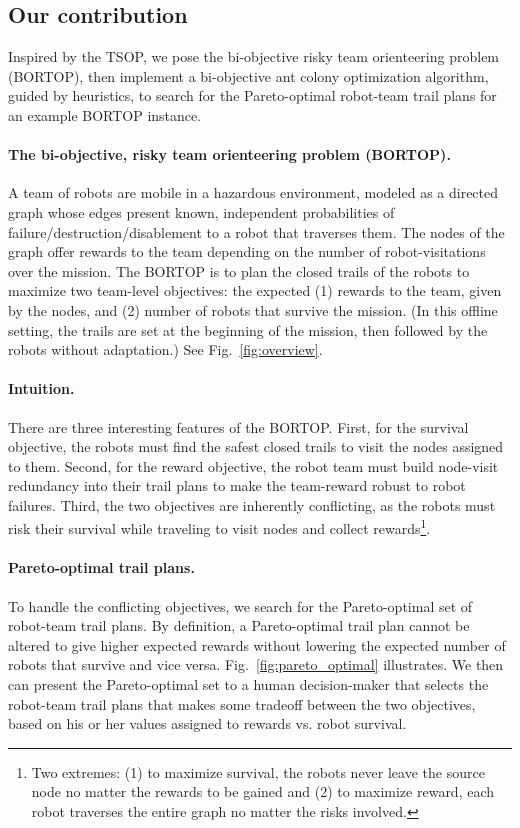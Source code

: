 \documentclass[11pt, oneside]{article}
\begin{document}
\subsection{Our contribution}
Inspired by the TSOP, we pose the bi-objective risky team orienteering problem (BORTOP), then implement a bi-objective ant colony optimization algorithm, guided by heuristics, to search for the Pareto-optimal robot-team trail plans for an example BORTOP instance.

\paragraph{The bi-objective, risky team orienteering problem (BORTOP).} 
A team of robots are mobile in a hazardous environment, modeled as a directed graph whose edges present known, independent probabilities of failure/destruction/disablement to a robot that traverses them.
The nodes of the graph offer rewards to the team depending on the number of robot-visitations over the mission.
The BORTOP is to plan the closed trails of the robots to maximize two team-level objectives: the expected
(1) rewards to the team, given by the nodes, and 
(2) number of robots that survive the mission. 
(In this offline setting, the trails are set at the beginning of the mission, then followed by the robots without adaptation.)
See Fig.~\ref{fig:overview}.

\paragraph{Intuition.} There are three interesting features of the BORTOP. 
First, for the survival objective, the robots must find the safest closed trails to visit the nodes assigned to them.
Second, for the reward objective, the robot team must build node-visit redundancy into their trail plans to make the team-reward robust to robot failures.
Third, the two objectives are inherently conflicting, as the robots must risk their survival while traveling to visit nodes and collect rewards\footnote{Two extremes:  (1) to maximize survival, the robots never leave the source node no matter the rewards to be gained and (2) to maximize reward, each robot traverses the entire graph no matter the risks involved.}.

\paragraph{Pareto-optimal trail plans.}
To handle the conflicting objectives, we search for the Pareto-optimal set of robot-team trail plans. By definition, a Pareto-optimal trail plan cannot be altered to give higher expected rewards without lowering the expected number of robots that survive and vice versa. 
Fig.~\ref{fig:pareto_optimal} illustrates.
We then can present the Pareto-optimal set to a human decision-maker that selects the robot-team trail plans that makes some tradeoff between the two objectives, based on his or her values assigned to rewards vs. robot survival. 
\end{document}
